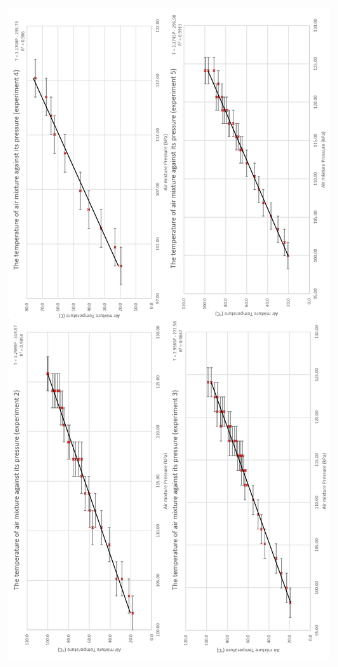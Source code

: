 \documentclass[a4paper,12pt]{article}
\begin{document}
\begin{figure}[H]
    \centering
    \includegraphics[width=0.76\textwidth]{assets/graphs.png}
    \label{fig:dg25}
\end{figure}
\end{document}
